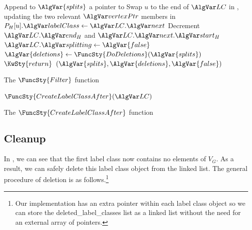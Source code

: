 \begin{algorithm}[htb]
{{{\nl          Append to $\AlgVar{splits}$ a pointer to \LC \;
         }
\nl      Swap $u$ to the end of $\LC$ in \Harray, updating the two relevant $\vertexPtr$ members in \Hptrs \;
\nl      $\Hptrs[u].\labelClass \gets \LC.\varNext$ \;
\nl      Decrement $\LC.\varEndH$ and $\LC.\varNext.\varStartH$  \;
    }
\medskip
\nl  {} {
\nl     $\LC.\varSplitting \gets \AlgVar{false}$ \;
}
\medskip
\nl  {} {
\nl     {}
\nl     {}
}
\medskip
    \nl  $\AlgVar{deletions} \gets \FuncSty{DoDeletions}(\AlgVar{splits})$
                 \label{McSplitSIDoDeletions}\;
\medskip
\nl  $\KwSty{return}$ $(\AlgVar{splits}, \AlgVar{deletions}, \AlgVar{false})$ \label{ReturnFromFilter}\;
}
\caption{The $\FuncSty{Filter}$ function}
\label{McSplitSIAlgFilter}
\end{algorithm}

\begin{algorithm}[htb]
\AlgorithmFontSize
\DontPrintSemicolon
\nl $\FuncSty{CreateLabelClassAfter}(\LC)$ \;
\nl {}
\caption{The $\FuncSty{CreateLabelClassAfter}$ function}
\label{McSplitSIAlgCreateLC}
\end{algorithm}

\subsection{Cleanup}

In , we can see that the first label class
now contains no elements of $V_G$.  As a result, we can safely delete this label
class object from the linked list.  The general procedure of deletion is as
follows.\footnote{Our implementation has an extra pointer within each label
class object so we can store the deleted\_label\_classes list as a linked list
without the need for an external array of pointers.}


